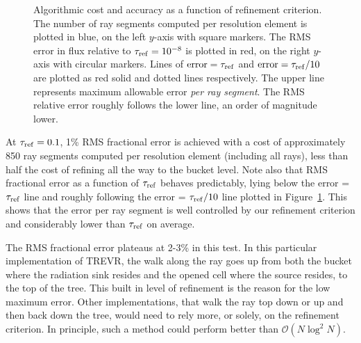 \documentclass[fleq,usenatbib]{mnras}
\newcommand{\acro}{TREVR}
\newcommand{\bigO}[1]{\mathcal{O}\left(#1\right)}
\newcommand{\tr}{\tau_{\rm ref}}
\begin{document}
{\begin{figure}
\caption{Algorithmic cost and accuracy as a function of refinement criterion. 
The number of ray segments computed per resolution element is plotted in blue, 
on the left $y$-axis with square markers. The RMS error in flux relative to 
$\tr=10^{-8}$ is plotted in red, on the right $y$-axis with circular markers. 
Lines of ${\rm error} = \tr$ and ${\rm error} = \tr/10$ are plotted as red 
solid and dotted lines respectively. The upper line represents maximum 
allowable error \textit{per ray segment}. The RMS relative error roughly 
follows the lower line, an order of magnitude lower.}
\label{fig:refcrit}
\end{figure}

At $\tr=0.1$, 1\% RMS fractional error is achieved with a cost of 
approximately 850 ray segments computed per resolution element (including all 
rays), less than half the cost of refining all the way to the bucket level. 
Note also that RMS fractional error as a function of $\tr$ behaves 
predictably, lying below the error = $\tr$ line and roughly following the 
error = $\tr/10$ line plotted in Figure~\ref{fig:refcrit}. This shows that the 
error per ray segment is well controlled by our refinement criterion and 
considerably lower than $\tr$ on average.

The RMS fractional error plateaus at 2-3\% in this test. In this particular 
implementation of \acro{}, the walk along the ray goes up from both the bucket 
where the radiation sink resides and the opened cell where the source resides, 
to the top of the tree. This built in level of refinement is the reason for 
the low maximum error. Other implementations, that walk the ray top down or up 
and then back down the tree, would need to rely more, or solely, on the 
refinement criterion. In principle, such a method could perform better than 
$\bigO{N\log^2 N}$.

}
\end{document}
